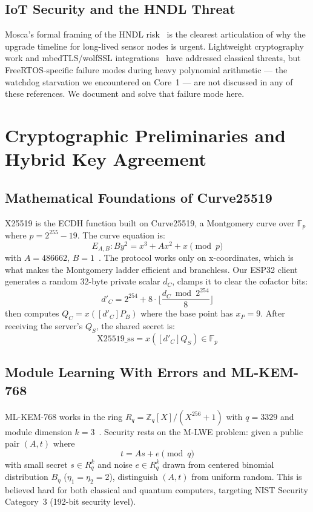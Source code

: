 \documentclass[journal, 10pt]{IEEEtran}
\begin{document}
\subsection{IoT Security and the HNDL Threat}
Mosca's formal framing of the HNDL risk~\cite{b10} is the clearest articulation of why the upgrade timeline for long-lived sensor nodes is urgent. Lightweight cryptography work and mbedTLS/wolfSSL integrations~\cite{b11,b21} have addressed classical threats, but FreeRTOS-specific failure modes during heavy polynomial arithmetic — the watchdog starvation we encountered on Core~1 — are not discussed in any of these references. We document and solve that failure mode here.

\section{Cryptographic Preliminaries and Hybrid Key Agreement}
\subsection{Mathematical Foundations of Curve25519}
X25519 is the ECDH function built on Curve25519, a Montgomery curve over $\mathbb{F}_p$ where $p = 2^{255} - 19$. The curve equation is:
\begin{equation}
E_{A,B} : By^2 = x^3 + Ax^2 + x \pmod{p}
\end{equation}
with $A = 486662$, $B = 1$~\cite{b5}. The protocol works only on x-coordinates, which is what makes the Montgomery ladder efficient and branchless. Our ESP32 client generates a random 32-byte private scalar $d_C$, clamps it to clear the cofactor bits:
\begin{equation}
d'_C = 2^{254} + 8 \cdot \lfloor \frac{d_C \bmod 2^{254}}{8} \rfloor
\end{equation}
then computes $Q_C = x([d'_C]P_B)$ where the base point has $x_P = 9$. After receiving the server's $Q_S$, the shared secret is:
\begin{equation}
\text{X25519\_ss} = x([d'_C]Q_S) \in \mathbb{F}_p
\end{equation}

\subsection{Module Learning With Errors and ML-KEM-768}
ML-KEM-768 works in the ring $R_q = \mathbb{Z}_q[X]/(X^{256} + 1)$ with $q = 3329$ and module dimension $k = 3$~\cite{b2}. Security rests on the M-LWE problem: given a public pair $(A, t)$ where
\begin{equation}
t = As + e \pmod{q}
\end{equation}
with small secret $s \in R_q^k$ and noise $e \in R_q^k$ drawn from centered binomial distribution $B_\eta$ ($\eta_1 = \eta_2 = 2$), distinguish $(A,t)$ from uniform random. This is believed hard for both classical and quantum computers, targeting NIST Security Category~3 (192-bit security level).
\end{document}
